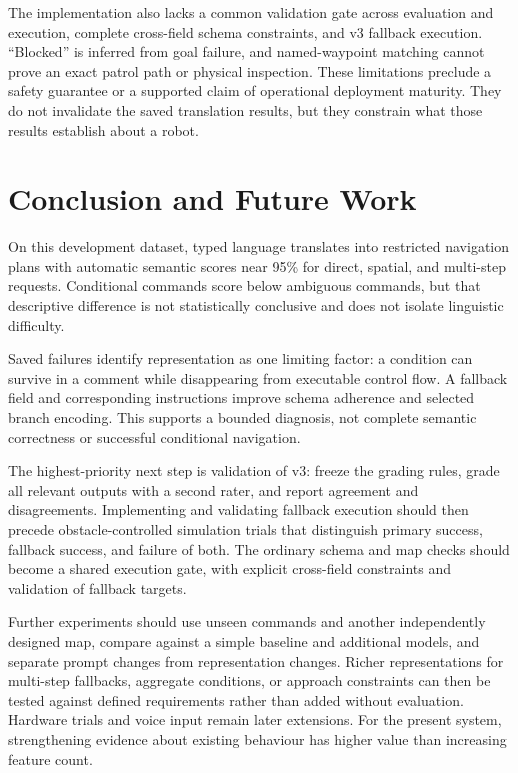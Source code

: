 \documentclass[journal]{IEEEtran}
\begin{document}
The implementation also lacks a common validation gate across evaluation and execution, complete cross-field schema constraints, and v3 fallback execution. ``Blocked'' is inferred from goal failure, and named-waypoint matching cannot prove an exact patrol path or physical inspection. These limitations preclude a safety guarantee or a supported claim of operational deployment maturity. They do not invalidate the saved translation results, but they constrain what those results establish about a robot.

\section{Conclusion and Future Work}
On this development dataset, typed language translates into restricted navigation plans with automatic semantic scores near 95\% for direct, spatial, and multi-step requests. Conditional commands score below ambiguous commands, but that descriptive difference is not statistically conclusive and does not isolate linguistic difficulty.

Saved failures identify representation as one limiting factor: a condition can survive in a comment while disappearing from executable control flow. A fallback field and corresponding instructions improve schema adherence and selected branch encoding. This supports a bounded diagnosis, not complete semantic correctness or successful conditional navigation.

The highest-priority next step is validation of v3: freeze the grading rules, grade all relevant outputs with a second rater, and report agreement and disagreements. Implementing and validating fallback execution should then precede obstacle-controlled simulation trials that distinguish primary success, fallback success, and failure of both. The ordinary schema and map checks should become a shared execution gate, with explicit cross-field constraints and validation of fallback targets.

Further experiments should use unseen commands and another independently designed map, compare against a simple baseline and additional models, and separate prompt changes from representation changes. Richer representations for multi-step fallbacks, aggregate conditions, or approach constraints can then be tested against defined requirements rather than added without evaluation. Hardware trials and voice input remain later extensions. For the present system, strengthening evidence about existing behaviour has higher value than increasing feature count.
\end{document}
